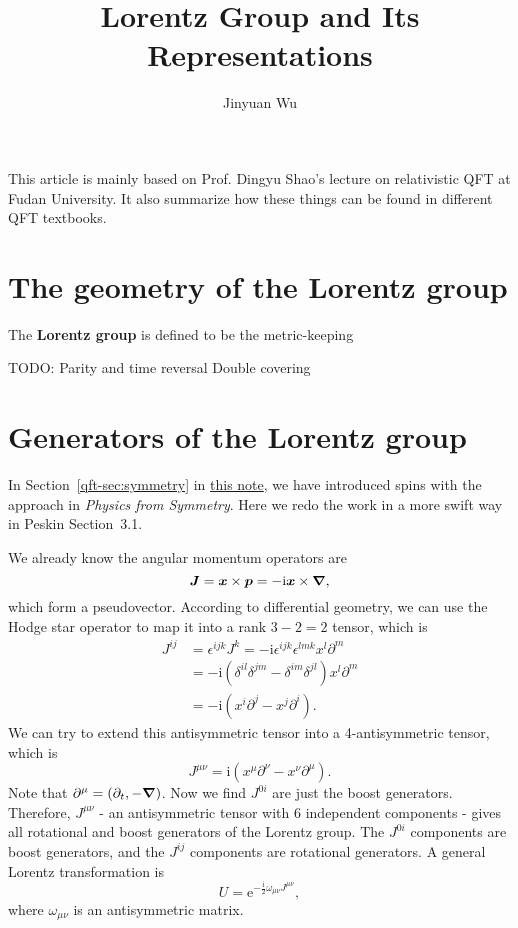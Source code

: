 \documentclass[hyperref, a4paper]{article}
\title{Lorentz Group and Its Representations}
\author{Jinyuan Wu}
\newcommand*{\ii}{\mathrm{i}}
\newcommand*{\ee}{\mathrm{e}}
\newcommand*{\concept}[1]{{\textbf{#1}}}
\begin{document}
\maketitle

This article is mainly based on Prof. Dingyu Shao's lecture on relativistic QFT at Fudan University.
It also summarize how these things can be found in different QFT textbooks.

\section{The geometry of the Lorentz group}

The \concept{Lorentz group} is defined to be the metric-keeping   

TODO: Parity and time reversal
Double covering

\section{Generators of the Lorentz group}

In Section~\ref{qft-sec:symmetry} in \href{../relativistic-qft/relativistic-qft.pdf}{this note}, we have 
introduced spins with the approach in \emph{Physics from Symmetry}. Here we redo the work in a more swift 
way in Peskin Section~3.1.

We already know the angular momentum operators are  
\begin{equation}
    \vb*{J} = \vb*{x} \times \vb*{p} = - \ii \vb*{x} \times \grad,
\end{equation}
which form a pseudovector. According to differential geometry, we can use the Hodge star operator to map it 
into a rank $3-2=2$ tensor, which is 
\begin{equation}
    \begin{aligned}
        J^{ij} &= \epsilon^{ijk} J^k = - \ii \epsilon^{ijk} \epsilon^{lmk} x^l \partial^m \\
        &= - \ii (\delta^{il} \delta^{jm} - \delta^{im} \delta^{jl}) x^l \partial^m \\
        &= - \ii (x^i \partial^j - x^j \partial^i).
    \end{aligned}
\end{equation}
We can try to extend this antisymmetric tensor into a 4-antisymmetric tensor, which is 
\begin{equation}
    J^{\mu \nu} = \ii (x^\mu \partial^\nu - x^\nu \partial^\mu).
    \label{eq:j-scalar-field}
\end{equation}
Note that $\partial^\mu = (\partial_t, - \grad)$. Now we find $J^{0 i}$ are just the boost generators.
Therefore, $J^{\mu \nu}$ - an antisymmetric tensor with 6 independent components - gives all rotational and 
boost generators of the Lorentz group. The $J^{0 i}$ components are boost generators, and the $J^{ij}$ 
components are rotational generators. A general Lorentz transformation is 
\begin{equation}
    U = \ee^{- \frac{\ii}{2} \omega_{\mu \nu} J^{\mu \nu}},
\end{equation}
where $\omega_{\mu \nu}$ is an antisymmetric matrix.
\end{document}
